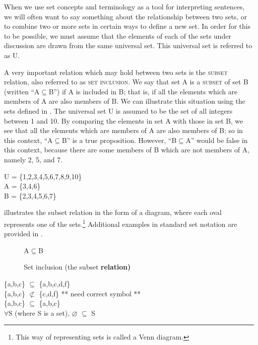 When we use set concepts and terminology as a tool for interpreting sentences, we will often want to say something about the relationship between two sets, or to combine two or more sets in certain ways to define a new set. In order for this to be possible, we must assume that the elements of each of the sets under discussion are drawn from the same universal set. This universal set is referred to as U.



A very important relation which may hold between two sets is the \textsc{subset} relation, also referred to as \textsc{set} \textsc{inclusion}. We say that set A is a \textsc{subset} of set B (written “A${\subseteq}$B”) if A is included in B; that is, if all the elements which are members of A are also members of B. We can illustrate this situation using the sets defined in . The universal set U is assumed to be the set of all integers between 1 and 10. By comparing the elements in set A with those in set B, we see that all the elements which are members of A are also members of B; so in this context, “A${\subseteq}$B” is a true proposition. However, “B${\subseteq}$A” would be false in this context, because there are some members of B which are not members of A, namely 2, 5, and 7.


\ea
U = \{1,2,3,4,5,6,7,8,9,10\}\\
A = \{3,4,6\}\\
B = \{2,3,4,5,6,7\}
\z


 illustrates the subset relation in the form of a diagram, where each oval represents one of the sets.\footnote{This way of representing sets is called a Venn diagram.} Additional examples in standard set notation are provided in .


\begin{figure}

  \textsf{A}\textbf{${\subseteq}$}\textsf{B}\\

\caption{\label{fig:key:1} Set inclusion (the subset \textbf{relation)}}
\end{figure}

\ea
\ea \{a,b,c\} ${\subseteq}$ \{a,b,c,d,f\}\\
\ex \{a,b,c\} ${\not\subset}$ \{c,d,f\}  ** need correct symbol **\\
\ex \{a,b,c\} ${\subseteq}$ \{a,b,c\}\\
\ex ${\forall}$S (where S is a set), ⌀ ${\subseteq}$ S
                       \z
\z


